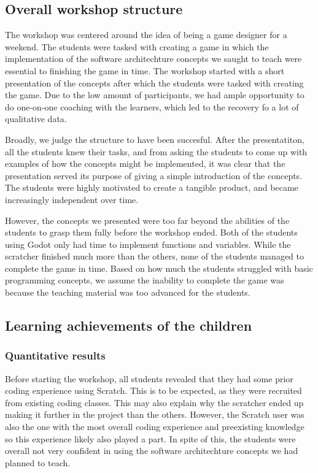 \subsection{Overall workshop structure}
The workshop was centered around the idea of being a game designer
for a weekend.
The students were tasked with creating a game in which
the implementation of the software architechture concepts we saught
to teach were essential to finishing the game in time.
The workshop
started with a short presentation of the concepts after which the
students were tasked with creating the game.
Due to the low amount of
participants, we had ample opportunity to do one-on-one coaching with
the learners, which led to the recovery fo a lot of qualitative data.

Broadly, we judge the structure to have been succesful.
After the
presentatiton, all the students knew their tasks, and from asking the
students to come up with examples of how the concepts might be
implemented, it was clear that the presentation served its purpose of
giving a simple introduction of the concepts.
The students were
highly motivated to create a tangible product, and became
increasingly independent over time.

However, the concepts we presented were too far beyond the abilities
of the students to grasp them fully before the workshop ended.
Both
of the students using Godot only had time to implement functions and
variables.
While the scratcher finished much more than the others, none of the
students managed to complete the game in time.
Based on how much the students struggled with basic programming concepts, we assume the inability to complete the game was because the teaching material was too advanced for the students.



\subsection{Learning achievements of the children}

\subsubsection{Quantitative results}
Before starting the workshop, all students revealed that they had some prior coding experience using Scratch. This is to be expected, as they were recruited from existing coding classes. This may also explain why the scratcher ended up making it further in the project than the others. However, the Scratch user was also the one with the most overall coding experience and preexisting knowledge so this experience likely also played a part. In spite of this, the students were overall not very confident in using the  software architechture concepts we had planned to teach. 


